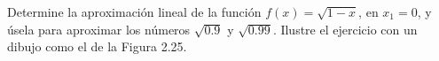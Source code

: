 \setcounter{enumi}{40}
\item Determine la aproximación lineal de la función $f(x) = \sqrt{1 - x}$, en $x_1 = 0$, y úsela para aproximar los números $\sqrt{0.9}$ y $\sqrt{0.99}$. Ilustre el ejercicio con un dibujo como el de la Figura 2.25.
